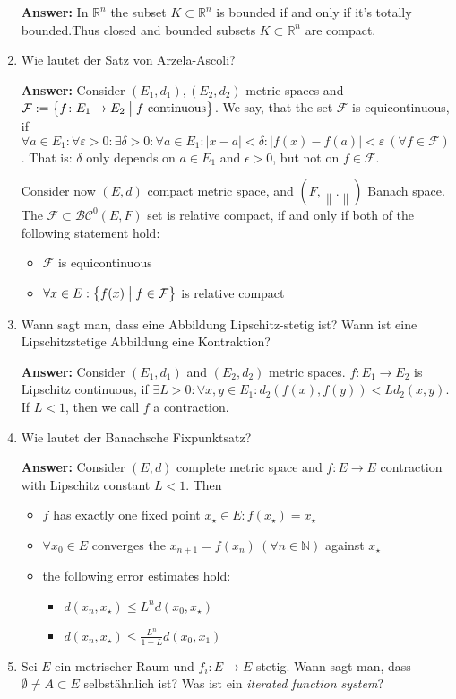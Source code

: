 \documentclass[11pt]{article}
\newcommand{\norm}[1]{\left\lVert#1\right\rVert}
\newcommand{\abs}[1]{\left|#1\right|}
\newcommand{\RR}[0]{\mathbb{R}}
\newcommand{\NN}[0]{\mathbb{N}}
\begin{document}
\begin{enumerate}
    \textbf{Answer:} In $\RR^n$ the subset $K \subset \RR^n$ is bounded if and only if it's totally bounded.Thus closed and bounded subsets $K \subset \RR^n$ are compact.

    \item Wie lautet der Satz von Arzela-Ascoli?

    \textbf{Answer:} Consider $(E_1, d_1), (E_2, d_2)$ metric spaces and $\mathcal{F} := \left\{f \colon E_1 \to E_2 \bigm| f\text{ continuous}\right\}$. We say, that the set $\mathcal{F}$ is equicontinuous, if $\forall a\in E_1\colon \forall \varepsilon > 0\colon \exists \delta > 0\colon \forall a\in E_1\colon \abs{x - a} < \delta\colon \abs{f(x) - f(a)} < \varepsilon~(\forall f \in \mathcal{F})$. That is: $\delta$ only depends on $a \in E_1$ and $\epsilon > 0$, but not on $f \in \mathcal{F}$.

    Consider now $(E, d)$ compact metric space, and $(F, \norm{.})$ Banach space. The $\mathcal{F} \subset \mathcal{BC}^0(E, F)$ set is relative compact, if and only if both of the following statement hold:
    \begin{itemize}
        \item $\mathcal{F}$ is equicontinuous
        \item $\forall x \in E: \left\{f(x) \bigm| f \in \mathcal{F}\right\}$ is relative compact
    \end{itemize}

    \item Wann sagt man, dass eine Abbildung Lipschitz-stetig ist? Wann ist eine Lipschitzstetige Abbildung eine Kontraktion?

    \textbf{Answer:} Consider $(E_1, d_1)$ and $(E_2, d_2)$ metric spaces. $f\colon E_1 \to E_2$ is Lipschitz continuous, if $\exists L > 0\colon \forall x, y\in E_1\colon d_2(f(x), f(y)) < L d_2(x, y)$. If $L < 1$, then we call $f$ a contraction.

    \item Wie lautet der Banachsche Fixpunktsatz?

    \textbf{Answer:} Consider $(E, d)$ complete metric space and $f\colon E \to E$ contraction with Lipschitz constant $L < 1$. Then
    \begin{itemize}
        \item $f$ has exactly one fixed point $x_\star \in E\colon f(x_\star) = x_\star$
        \item $\forall x_0 \in E$ converges the $x_{n+1} = f(x_n)~(\forall n \in \NN)$ against $x_\star$
        \item the following error estimates hold:
        \begin{itemize}
            \item $d(x_n, x_\star) \le L^n d(x_0, x_\star)$
            \item $d(x_n, x_\star) \le \frac{L^n}{1-L}d(x_0, x_1)$
        \end{itemize}
    \end{itemize}
    \item Sei $E$ ein metrischer Raum und $f_i \colon E \to E$ stetig. Wann sagt man, dass $\emptyset \neq A \subset E$ selbstähnlich ist? Was ist ein \textit{iterated function system}?


\end{enumerate}
\end{document}
